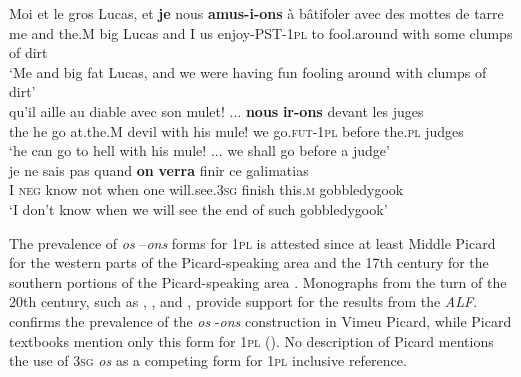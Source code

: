 \documentclass[output=paper,colorlinks,citecolor=brown]{langscibook}
\begin{document}
\ea\label{02:ex:1a}  \gll Moi et    le      gros Lucas, et   \textbf{je} nous \textbf{amus-i-ons}     à   bâtifoler   avec   des mottes  de  tarre\\
me  and the.M big   Lucas  and I  us     enjoy-PST-1\textsc{pl} to fool.around with some clumps of  dirt\\ 
\glt   ‘Me and big fat Lucas, and we were having fun fooling around with clumps of dirt’\\
\ex\label{02:ex:1b} \gll qu’il  aille au         diable avec son mulet! ... \textbf{nous} \textbf{ir-ons}          devant les      juges\\
the he go   at.the.M devil  with  his  mule!     we      go.\textsc{fut}-1\textsc{pl} before the.\textsc{pl} judges\\ 
\glt ‘he can go to hell with his mule! ... we shall go before a judge’ \\

\ex\label{02:ex:1c} \gll je ne   sais   pas quand \textbf{on}  \textbf{verra}            finir   ce       galimatias\\
I  \textsc{neg} know not when  one will.see.3\textsc{sg} finish this.\textsc{m} gobbledygook\\ 
\glt ‘I don't know when we will see the end of such gobbledygook’ \\
\z
\z

The prevalence of \textit{os} –\textit{ons} forms for 1\textsc{pl} is attested since at least Middle Picard for the western parts of the Picard-speaking area and the 17th century for the southern portions of the Picard-speaking area \citep[140, 147]{flutre_moyen_1970}. Monographs from the turn of the 20th century, such as \citet{edmont_lexique_1980}, \citet{ledieu_petite_1909}, and \citet{hrkal_grammaire_1910}, provide support for the results from the \textit{ALF}. \citet{vasseur_grammaire_1996} confirms the prevalence of the \textit{os} -\textit{ons} construction in Vimeu Picard, while Picard textbooks mention only this form for 1\textsc{pl} (\cites[]{debrie_eche_1983}[86]{dawson_dictionnaire_2020}). No description of Picard mentions the use of 3\textsc{sg} \textit{os} as a competing form for 1\textsc{pl} inclusive reference.
\end{document}
